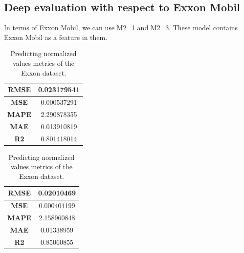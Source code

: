 \subsection{Deep evaluation with respect to Exxon Mobil}
In terms of Exxon Mobil, we can use M2\_1 and M2\_3. These model contains
Exxon Mobil as a feature in them.

\begin{table}[H]
	\centering
	\begin{minipage}{0.45\textwidth}
		\centering
		\begin{tabular}{|c|c|}
			\hline
			\textbf{RMSE} & 0.023179541 \\
			\hline
			\textbf{MSE}  & 0.000537291 \\
			\hline
			\textbf{MAPE} & 2.290878355 \\
			\hline
			\textbf{MAE}  & 0.013910819 \\
			\hline
			\textbf{R2}   & 0.801418014 \\
			\hline
		\end{tabular}
	\end{minipage}
	\begin{minipage}{0.45\textwidth}
		\centering
		\begin{tabular}{|c|c|}
			\hline
			\textbf{RMSE} & 0.02010469  \\
			\hline
			\textbf{MSE}  & 0.000404199 \\
			\hline
			\textbf{MAPE} & 2.158960848 \\
			\hline
			\textbf{MAE}  & 0.01338959  \\
			\hline
			\textbf{R2}   & 0.85060855  \\
			\hline
		\end{tabular}
	\end{minipage}
	\caption{Predicting normalized values metrics of the Exxon dataset.}
	\label{metric:exx_nor}
\end{table}
